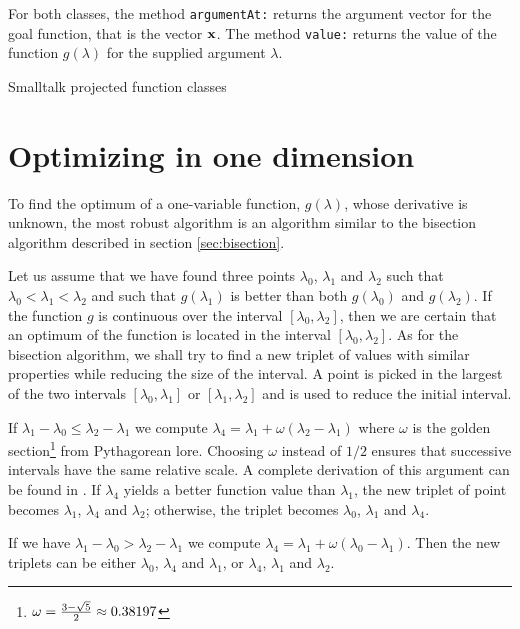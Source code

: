 \documentclass[twoside]{book}
\begin{document}
For both classes, the method {\tt argumentAt:} returns the
argument vector for the goal function, that is the vector ${\bf
x}$. The method {\tt value:} returns the value of the function
$g\left(\lambda\right)$ for the supplied argument $\lambda$.

\begin{listing} Smalltalk projected function classes \label{ls:projectedfunctions}


\end{listing}

\section{Optimizing in one dimension}
\label{sec:optonedim} To find the optimum of a one-variable
function, $g\left(\lambda\right)$, whose derivative is unknown,
the most robust algorithm is an algorithm similar to the bisection
algorithm described in section \ref{sec:bisection}.

Let us assume that we have found three points $\lambda_0$,
$\lambda_1$ and $\lambda_2$ such that
$\lambda_0<\lambda_1<\lambda_2$ and such that
$g\left(\lambda_1\right)$ is better than both
$g\left(\lambda_0\right)$ and $g\left(\lambda_2\right)$. If the
function $g$ is continuous over the interval
$\left[\lambda_0,\lambda_2\right]$, then we are certain that an
optimum of the function is located in the interval
$\left[\lambda_0,\lambda_2\right]$. As for the bisection
algorithm, we shall try to find a new triplet of values with
similar properties while reducing the size of the interval. A
point is picked in the largest of the two intervals
$\left[\lambda_0,\lambda_1\right]$ or
$\left[\lambda_1,\lambda_2\right]$ and is used to reduce the
initial interval.

If $\lambda_1-\lambda_0\leq\lambda_2-\lambda_1$ we compute
$\lambda_4 =\lambda_1 + \omega\left(\lambda_2-\lambda_1\right)$
where $\omega$ is the golden
section\footnote{$\omega={3-\sqrt{5}\over 2}\approx0.38197$} from
Pythagorean lore. Choosing $\omega$ instead of $1/2$ ensures that
successive intervals have the same relative scale. A complete
derivation of this argument can be found in \cite{Press}. If
$\lambda_4$ yields a better function value than $\lambda_1$, the
new triplet of point becomes $\lambda_1$, $\lambda_4$ and
$\lambda_2$; otherwise, the triplet becomes $\lambda_0$,
$\lambda_1$ and $\lambda_4$.

If we have $\lambda_1-\lambda_0>\lambda_2-\lambda_1$ we compute
$\lambda_4 =\lambda_1 + \omega\left(\lambda_0-\lambda_1\right)$.
Then the new triplets can be either $\lambda_0$, $\lambda_4$ and
$\lambda_1$, or $\lambda_4$, $\lambda_1$ and $\lambda_2$.
\end{document}
